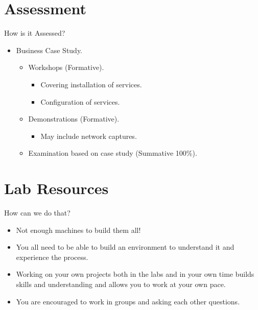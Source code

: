 \documentclass{beamer}
\begin{document}
\section{Assessment}
\begin{frame}{How is it Assessed?}
  \begin{itemize}
    \item Business Case Study.
    \begin{itemize}
      \item Workshops (Formative).
        \begin{itemize}
          \item Covering installation of services.
          \item Configuration of services.
        \end{itemize}
      \item Demonstrations (Formative).
        \begin{itemize}
          \item May include network captures.
        \end{itemize}
    \item Examination based on case study (Summative 100\%).
    \end{itemize}
  \end{itemize}
\end{frame}

\section{Lab Resources}
\begin{frame}{How can we do that?}
  \begin{itemize}
    \item Not enough machines to build them all!
    \item You all need to be able to build an environment to understand it and experience the process.
    \item Working on your own projects both in the labs and in your own time builds skills and understanding and allows you to work at your own pace.
    \item You are encouraged to work in groups and asking each other questions.
  \end{itemize}
\end{frame}
\end{document}
